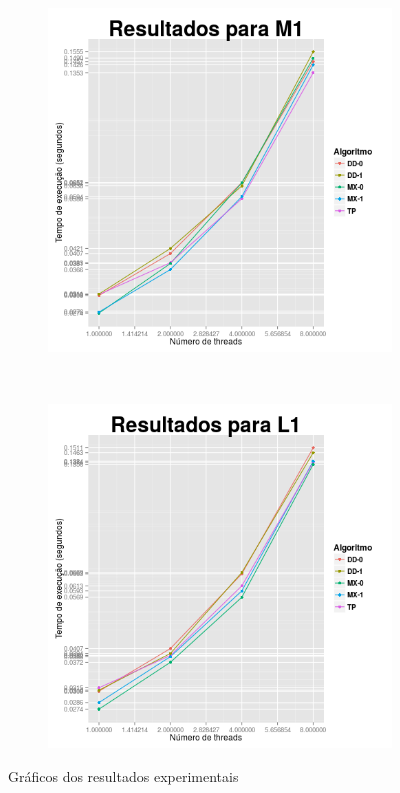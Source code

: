\documentclass[10pt,a4paper,oneside]{article}
\begin{document}
\begin{figure}[t]
    \begin{subfigure}[b]{0.45\textwidth}
      \centering
      \includegraphics[width=\textwidth]{M1.png}
    \end{subfigure}
    ~
    \begin{subfigure}[b]{0.45\textwidth}
      \centering
      \includegraphics[width=\textwidth]{L1.png}
    \end{subfigure}

    \caption{Gráficos dos resultados experimentais}
    \label{fig:res}
\end{figure}
\end{document}
